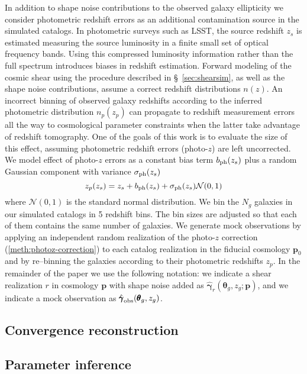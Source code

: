 \documentclass[reprint,aps,prd,superscriptaddress,showkeys,showpacs]{revtex4-1}
\newcommand{\bb}[1]{\mathbf{#1}}
\newcommand{\h}[1]{\hat{#1}}
\begin{document}
In addition to shape noise contributions to the observed galaxy ellipticity we consider photometric redshift errors as an additional contamination source in the simulated catalogs. In photometric surveys such as LSST, the source redshift $z_s$ is estimated measuring the source luminosity in a finite small set of optical frequency bands. Using this compressed luminosity information rather than the full spectrum introduces biases in redshift estimation. Forward modeling of the cosmic shear using the procedure described in \S~\ref{sec:shearsim}, as well as the shape noise contributions, assume a correct redshift distributions $n(z)$. An incorrect binning of observed galaxy redshifts according to the inferred photometric distribution $n_p(z_p)$ can propagate to redshift measurement errors all the way to cosmological parameter constraints when the latter take advantage of redshift tomography. One of the goals of this work is to evaluate the size of this effect, assuming photometric redshift errors (photo-$z$) are left uncorrected. We model effect of photo-$z$ errors as a constant bias term $b_{\rm ph}(z_s)$ plus a random Gaussian component with variance $\sigma_{\rm ph}(z_s)$
\begin{equation}
\label{meth:photoz-correction}
z_p(z_s) = z_s + b_{\rm ph}(z_s) + \sigma_{\rm ph}(z_s)\mathcal{N}(0,1)   
\end{equation}
%
where $\mathcal{N}(0,1)$ is the standard normal distribution. We bin the $N_g$ galaxies in our simulated catalogs in 5 redshift bins. The bin sizes are adjusted so that each of them contains the same number of galaxies. We generate mock observations by applying an independent random realization of the photo-$z$ correction (\ref{meth:photoz-correction}) to each catalog realization in the fiducial cosmology $\bb{p}_0$ and by re--binning the galaxies according to their photometric redshifts $z_p$. In the remainder of the paper we use the following notation: we indicate a shear realization $r$ in cosmology $\bb{p}$ with shape noise added as $\h{\pmb{\gamma}}_r(\pmb{\theta}_g,z_g;\bb{p})$, and we indicate a mock observation as $\h{\pmb{\gamma}}_{\rm obs}(\pmb{\theta}_g,z_g)$.           

\subsection{Convergence reconstruction}

\subsection{Parameter inference}
\end{document}
